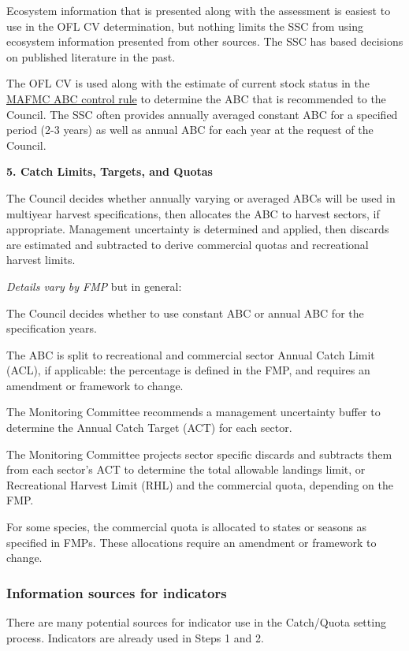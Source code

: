 \documentclass[
]{article}
\begin{document}
Ecosystem information that is presented along with the assessment is easiest to use in the OFL CV determination, but nothing limits the SSC from using ecosystem information presented from other sources. The SSC has based decisions on published literature in the past.

The OFL CV is used along with the estimate of current stock status in the \href{http://www.mafmc.org/s/MAFMC-ABC-Control-Rule-White-Paper.pdf}{MAFMC ABC control rule} to determine the ABC that is recommended to the Council. The SSC often provides annually averaged constant ABC for a specified period (2-3 years) as well as annual ABC for each year at the request of the Council.

\textbf{5. Catch Limits, Targets, and Quotas}

The Council decides whether annually varying or averaged ABCs will be used in multiyear harvest specifications, then allocates the ABC to harvest sectors, if appropriate. Management uncertainty is determined and applied, then discards are estimated and subtracted to derive commercial quotas and recreational harvest limits.

\emph{Details vary by FMP} but in general:

The Council decides whether to use constant ABC or annual ABC for the specification years.

The ABC is split to recreational and commercial sector Annual Catch Limit (ACL), if applicable: the percentage is defined in the FMP, and requires an amendment or framework to change.

The Monitoring Committee recommends a management uncertainty buffer to determine the Annual Catch Target (ACT) for each sector.

The Monitoring Committee projects sector specific discards and subtracts them from each sector's ACT to determine the total allowable landings limit, or Recreational Harvest Limit (RHL) and the commercial quota, depending on the FMP.

For some species, the commercial quota is allocated to states or seasons as specified in FMPs. These allocations require an amendment or framework to change.

\subsubsection{Information sources for indicators}\label{information-sources-for-indicators}

There are many potential sources for indicator use in the Catch/Quota setting process. Indicators are already used in Steps 1 and 2.
\end{document}
